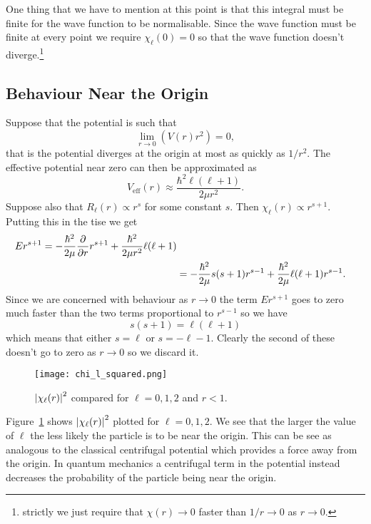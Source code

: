 \documentclass[a4paper]{article}
\newcommand{\eff}{{\mathrm{eff}}}
\theoremstyle{definition}
\begin{document}
    One thing that we have to mention at this point is that this integral must be finite for the wave function to be normalisable.
    Since the wave function must be finite at every point we require \(\chi_\ell(0) = 0\) so that the wave function doesn't diverge.\footnote{strictly we just require that \(\chi(r)\to 0\) faster than \(1/r\to 0\) as \(r\to 0\).}
    
    \subsection{Behaviour Near the Origin}\label{sec:behaviour near the origin central potential}
    Suppose that the potential is such that
    \[\lim_{r\to 0}(V(r)r^2) = 0,\]
    that is the potential diverges at the origin at most as quickly as \(1/r^2\).
    The effective potential near zero can then be approximated as
    \[V_{\eff}(r) \approx \frac{\hbar^2\ell(\ell + 1)}{2\mu r^2}.\]
    Suppose also that \(R_\ell(r)\propto r^s\) for some constant \(s\).
    Then \(\chi_\ell(r) \propto r^{s+1}\).
    Putting this in the \gls{tise} we get
    \begin{align*}
        Er^{s+1} = -\frac{\hbar^2}{2\mu}\pdv{r}r^{s + 1} + \frac{\hbar^2}{2\mu r^2}\ell(\ell + 1)\\
        &= -\frac{\hbar^2}{2\mu}s(s + 1)r^{s-1} + \frac{\hbar^2}{2\mu}\ell(\ell + 1)r^{s-1}.
    \end{align*}
    Since we are concerned with behaviour as \(r\to 0\) the term \(Er^{s+1}\) goes to zero much faster than the two terms proportional to \(r^{s-1}\) so we have
    \[s(s + 1) = \ell(\ell + 1)\]
    which means that either \(s = \ell\) or \(s = -\ell - 1\).
    Clearly the second of these doesn't go to zero as \(r\to 0\) so we discard it.
    \begin{figure}[ht]
        \centering
        \texttt{[image: chi\_l\_squared.png]}
        \caption{\(\abs{\chi_\ell(r)}^2\) compared for \(\ell = 0, 1, 2\) and \(r < 1\).}
        \label{fig:chi for low r}
    \end{figure}
    Figure~\ref{fig:chi for low r} shows \(\abs{\chi_\ell(r)}^2\) plotted for \(\ell = 0, 1, 2\).
    We see that the larger the value of \(\ell\) the less likely the particle is to be near the origin.
    This can be see as analogous to the classical centrifugal potential which provides a force away from the origin.
    In quantum mechanics a centrifugal term in the potential instead decreases the probability of the particle being near the origin.
    
\end{document}
